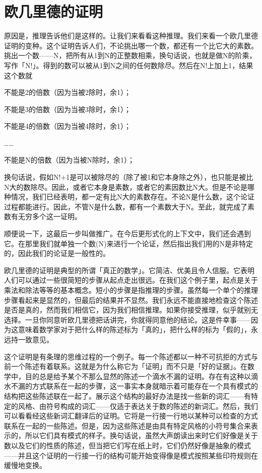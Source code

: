 \documentclass[
  12pt,
  twoside,
  openright,
  oldfontcommands,
]{memoir}
\begin{document}
\section{欧几里德的证明}

原因是，推理告诉他们是这样的。让我们来看看这种推理。我们来看一个欧几里德证明的变种。这个证明告诉人们，不论挑出哪一个数，都还有一个比它大的素数。挑出一个数------N，把所有从1到N的正整数相乘，换句话说，也就是做N的阶乘，写作「N!」。得到的数可以被从1到N之间的任何数除尽。然后在N!上加上1，结果这个数就

不能是2的倍数（因为当被2除时，余1）；

不能是3的倍数（因为当被3除时，余1）；

不能是4的倍数（因为当被4除时，余1）；

\ldots\ldots{}

不能是N的倍数（因为当被N除时，余1）；

换句话说，假如N!+1是可以被除尽的（除了被1和它本身除之外），也只能是被比N大的数除尽。因此，或者它本身是素数，或者它的素因数比N大。但是不论是哪种情况，我们已经表明，都一定有比N大的素数存在。不论N是什么数，这个论证过程都能进行。因此，不管N是什么数，都有一个素数大于N。至此，就完成了素数有无穷多个这一证明。

顺便说一下，这最后一步叫做推广。在今后更形式化的上下文中，我们还会遇到它。在那里我们就单独一个数(N)来进行一个论证，然后指出我们用的N是非特定的，因此我们的论证是一般性的。

欧几里德的证明是典型的所谓「真正的数学」。它简洁、优美且令人信服。它表明人们可以通过一些很简短的步骤从起点走出很远。在我们这个例子里，起点是关于乘法和除法等等的基本概念。短小的步骤是指推理的步骤。虽然每一个单个的推理步骤看起来是显然的，但最后的结果并不显然。我们永远不能直接地检查这个陈述是否是真的，然而我们相信它，因为我们相信推理。如果你接受推理，似乎就别无选择。一旦你同意听欧几里德把话讲完，你就得同意他的结论。这是件幸事------因为这意味着数学家对于把什么样的陈述标为「真的」，把什么样的标为「假的」，永远持一致意见。

这个证明是有条理的思维过程的一个例子。每一个陈述都以一种不可抗拒的方式与前一个陈述有着联系。这就是为什么称它为「证明」而不只是「好的证据」。在数学中，目的总是给予某个不那么显然的陈述一个滴水不漏的证明。存在有这种以滴水不漏的方式联系在一起的步骤，这一事实本身就暗示着可能存在一个具有模式的结构把这些陈述联在一起了。展示这个结构的最好办法是找一些新的词汇------有特定的风格、由符号构成的词汇------仅适于表达关于数的陈述的新词汇。然后，我们可以看看经这些新词汇翻译后的证明。它将是一行接一行地以某种可以检查的方式联系在一起的一些陈述。但是，因为这些陈述是由具有特定风格的小符号集合来表示的，所以它们具有模式的样子。换句话说，虽然大声朗读出来时它们好像是关于数以及它们的性质的陈述，但当把它们写在纸上时，它们仍然好像是抽象的模式------并且这个证明的一行接一行的结构可能开始变得像是模式按照某些印符规则在缓慢地变换。
\end{document}
